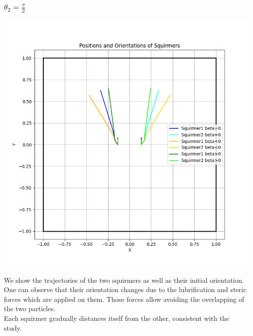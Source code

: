 \documentclass{article}
\begin{document}
\subsubsection{$\theta_2 = \frac{\pi}{2}$}
\begin{center}
   \includegraphics[width=1\textwidth]{graphs/simulations/twosquirmerinter/sq2.pi.2.png}
\end{center}
We show the trajectories of the two squirmers as well as their initial orientation.
One can observe that their orientation changes due to the lubrification and steric forces which are applied on them. 
Those forces allow avoiding the overlapping of the two particles.\\
Each squirmer gradually distances itself from the other,
 consistent with the study\cite{Stark}.
\end{document}
